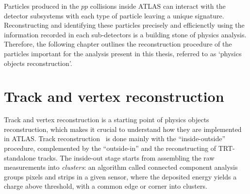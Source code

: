 \large
Particles produced in the $pp$ collisions inside ATLAS can interact with the detector subsystems
with each type of particle leaving a unique signature.
Reconstructing and identifying these particles precisely and efficienctly 
using the information recorded in each sub-detectors is a building stone of physics analysis.
Therefore, the following chapter outlines the reconstruction procedure of 
the particles important for the analysis present in this thesis, referred to
as `physics objects reconstruction'.
\section{Track and vertex reconstruction}
\label{sec:track}
Track and vertex reconstruction is a starting point of physics objects reconstruction, 
which makes it crucial to understand how they are implemented in ATLAS.
Track reconstruction~\cite{ATLAS-CONF-2012-042,PERF-2015-08} is done 
mainly with the ``inside-outside'' procedure, complemented by the ``outside-in'' 
and the reconstructing of TRT-standalone tracks. 
The inside-out stage starts from assembling the raw measurements
into \textit{clusters}:
an algorithm called connected component analysis~\cite{CCA} 
groups pixels and strips in a given sensor, 
where the deposited energy yields a charge above threshold, 
with a common edge or corner into clusters. 
    
